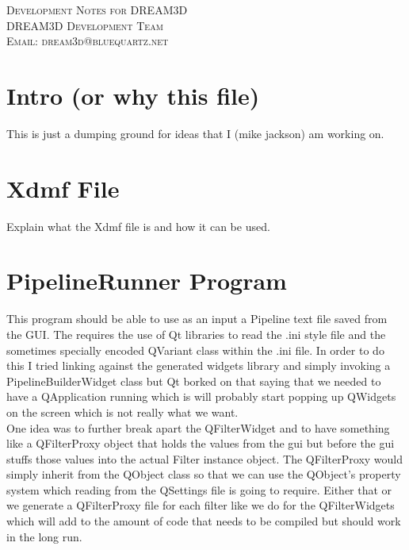 \documentclass[12pt]{article} %
\begin{document}
\begin{center}
\textsc{\huge Development Notes for DREAM3D}\\[1.5cm]
\textsc{\large DREAM3D Development Team\\
Email: dream3d@bluequartz.net}\\[1.5cm]
\end{center}

{}
\section{Intro (or why this file)}
  This is just a dumping ground for ideas that I (mike jackson) am working on.
  
\section{Xdmf File}
  Explain what the Xdmf file is and how it can be used.
  
\section{PipelineRunner Program}
  This program should be able to use as an input a Pipeline text file saved from the GUI. The requires the use of Qt libraries to read the .ini style file and the sometimes specially encoded QVariant class within the .ini file. In order to do this I tried linking against the generated widgets library and simply invoking a PipelineBuilderWidget class but Qt borked on that saying that we needed to have a QApplication running which is will probably start popping up QWidgets on the screen which is not really what we want.\\
  
  
 One idea was to further break apart the QFilterWidget and to have something like a QFilterProxy object that holds the values from the gui but before the gui stuffs those values into the actual Filter instance object. The QFilterProxy would simply inherit from the QObject class so that we can use the QObject's property system which reading from the QSettings file is going to require. Either that or we generate a QFilterProxy file for each filter like we do for the QFilterWidgets which will add to the amount of code that needs to be compiled but should work in the long run.
\end{document}
